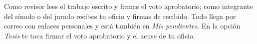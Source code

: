 \documentclass[11pt,a4paper]{article}
\begin{document}
{\small\tableofcontents}
\newpage
\begin{quevasahacer}
Como revisor lees el trabajo escrito y firmas el voto aprobatorio; como integrante del sínodo o del jurado recibes tu oficio y firmas de recibido. Todo llega por correo con enlaces personales y está también en \emph{Mis pendientes}. En la opción \emph{Tesis} te toca firmar el voto aprobatorio y el acuse de tu oficio.
\end{quevasahacer}



\end{document}
